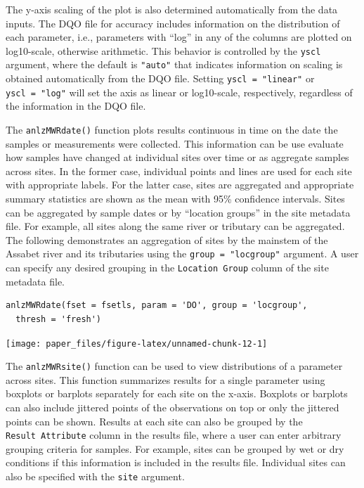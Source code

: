 The y-axis scaling of the plot is also determined automatically from the data inputs. The DQO file for accuracy includes information on the distribution of each parameter, i.e., parameters with ``log'' in any of the columns are plotted on log10-scale, otherwise arithmetic. This behavior is controlled by the \texttt{yscl} argument, where the default is \texttt{"auto"} that indicates information on scaling is obtained automatically from the DQO file. Setting \texttt{yscl\ =\ "linear"} or \texttt{yscl\ =\ "log"} will set the axis as linear or log10-scale, respectively, regardless of the information in the DQO file.

The \texttt{anlzMWRdate()} function plots results continuous in time on the date the samples or measurements were collected. This information can be use evaluate how samples have changed at individual sites over time or as aggregate samples across sites. In the former case, individual points and lines are used for each site with appropriate labels. For the latter case, sites are aggregated and appropriate summary statistics are shown as the mean with 95\% confidence intervals. Sites can be aggregated by sample dates or by ``location groups'' in the site metadata file. For example, all sites along the same river or tributary can be aggregated. The following demonstrates an aggregation of sites by the mainstem of the Assabet river and its tributaries using the \texttt{group\ =\ "locgroup"} argument. A user can specify any desired grouping in the \texttt{Location\ Group} column of the site metadata file.

\begin{verbatim}
anlzMWRdate(fset = fsetls, param = 'DO', group = 'locgroup', 
  thresh = 'fresh')
\end{verbatim}

\texttt{[image: paper\_files/figure-latex/unnamed-chunk-12-1]}

The \texttt{anlzMWRsite()} function can be used to view distributions of a parameter across sites. This function summarizes results for a single parameter using boxplots or barplots separately for each site on the x-axis. Boxplots or barplots can also include jittered points of the observations on top or only the jittered points can be shown. Results at each site can also be grouped by the \texttt{Result\ Attribute} column in the results file, where a user can enter arbitrary grouping criteria for samples. For example, sites can be grouped by wet or dry conditions if this information is included in the results file. Individual sites can also be specified with the \texttt{site} argument.

